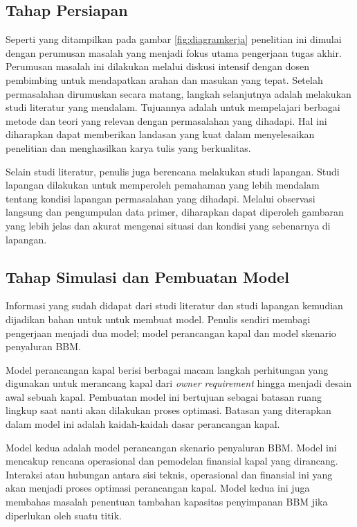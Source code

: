\subsection{Tahap Persiapan}
 \label{subsec:tahap-persiapan}
    Seperti yang ditampilkan pada gambar \ref{fig:diagramkerja} penelitian ini dimulai dengan perumusan masalah yang menjadi fokus utama pengerjaan tugas akhir. Perumusan masalah ini dilakukan melalui diskusi intensif dengan dosen pembimbing untuk mendapatkan arahan dan masukan yang tepat. Setelah permasalahan dirumuskan secara matang, langkah selanjutnya adalah melakukan studi literatur yang mendalam. Tujuannya adalah untuk mempelajari berbagai metode dan teori yang relevan dengan permasalahan yang dihadapi. Hal ini diharapkan dapat memberikan landasan yang kuat dalam menyelesaikan penelitian dan menghasilkan karya tulis yang berkualitas.
    
    Selain studi literatur, penulis juga berencana melakukan studi lapangan. Studi lapangan dilakukan untuk memperoleh pemahaman yang lebih mendalam tentang kondisi lapangan permasalahan yang dihadapi. Melalui observasi langsung dan pengumpulan data primer, diharapkan dapat diperoleh gambaran yang lebih jelas dan akurat mengenai situasi dan kondisi yang sebenarnya di lapangan.

\subsection{Tahap Simulasi dan Pembuatan Model}
\label{subsec:tahap-simulasi}

    Informasi yang sudah didapat dari studi literatur dan studi lapangan kemudian dijadikan bahan untuk untuk membuat model. Penulis sendiri membagi pengerjaan menjadi dua model; model perancangan kapal dan model skenario penyaluran BBM.

    Model perancangan kapal berisi berbagai macam langkah perhitungan yang digunakan untuk merancang kapal dari \emph{owner requirement} hingga menjadi desain awal sebuah kapal. Pembuatan model ini bertujuan sebagai batasan ruang lingkup saat nanti akan dilakukan proses optimasi. Batasan yang diterapkan dalam model ini adalah kaidah-kaidah dasar perancangan kapal.

    Model kedua adalah model perancangan skenario penyaluran BBM. Model ini mencakup rencana operasional dan pemodelan finansial kapal yang dirancang. Interaksi atau hubungan antara sisi teknis, operasional dan finansial ini yang akan menjadi proses optimasi perancangan kapal. Model kedua ini juga membahas masalah penentuan tambahan kapasitas penyimpanan BBM jika diperlukan oleh suatu titik.

